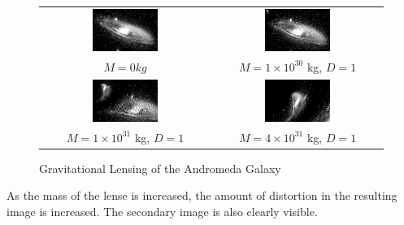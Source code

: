 \documentclass[aspectratio=1610,xcolor=dvipsnames,t]{beamer}
\begin{document}
\begin{figure}
    \caption{Gravitational Lensing of the Andromeda Galaxy} 
    \label{fig:andromeda} 
\begin{center}
    \begin{tabular}{cc} 
    \includegraphics[width=0.4\textwidth]{pics/andromeda.eps}  &
    \includegraphics[width=0.4\textwidth]{pics/1e30and.eps}  \\
    $M = 0 kg$ & $M = 1 \times 10^{30}$ kg, $D = 1$ \\ 
    \includegraphics[width=0.4\textwidth]{pics/1e31and.eps}  &
    \includegraphics[width=0.4\textwidth]{pics/4e31and.eps} \\
    $M = 1 \times 10^{31}$ kg, $D = 1$ &  $M = 4 \times 10^{31}$ kg, $D = 1$ \\ 
    \end{tabular} 
\end{center}
\end{figure}

As the mass of the lense is increased, the amount of distortion in the
resulting image is increased. The secondary image is also clearly visible.
\end{document}
